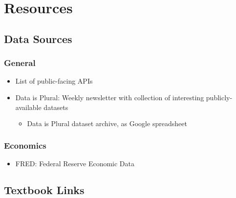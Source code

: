 \documentclass[
  letterpaper,
  DIV=11,
  numbers=noendperiod,
  oneside]{scrreprt}
\providecommand{\tightlist}{%
  \setlength{\itemsep}{0pt}\setlength{\parskip}{0pt}}\usepackage{longtable,booktabs,array}
\begin{document}
\hypertarget{resources}{%
\chapter{Resources}\label{resources}}

\hypertarget{data-sources}{%
\section{Data Sources}\label{data-sources}}

\hypertarget{general}{%
\subsection{General}\label{general}}

\begin{itemize}
\tightlist
\item
  List of public-facing APIs
\item
  Data is Plural: Weekly newsletter with collection of interesting
  publicly-available datasets

  \begin{itemize}
  \tightlist
  \item
    Data is Plural dataset archive, as Google spreadsheet
  \end{itemize}
\end{itemize}

\hypertarget{economics}{%
\subsection{Economics}\label{economics}}

\begin{itemize}
\tightlist
\item
  FRED: Federal Reserve Economic Data
\end{itemize}

\hypertarget{textbook-links}{%
\section{Textbook Links}\label{textbook-links}}
\end{document}
